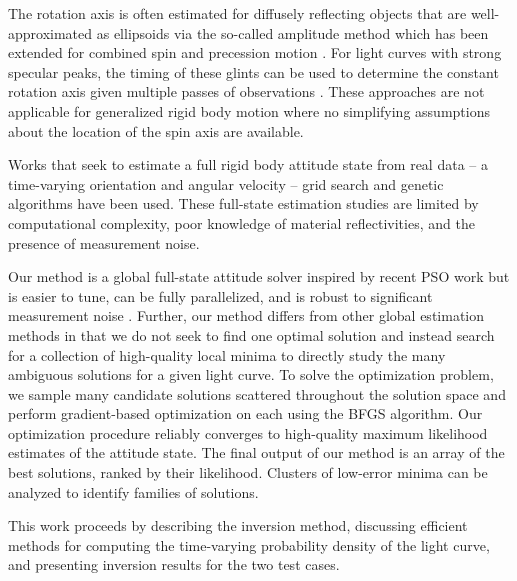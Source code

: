 \documentclass[a4paper,twocolumn]{spaceDebrisC} %
\begin{document}
The rotation axis is often estimated for diffusely reflecting objects that are well-approximated as ellipsoids via the so-called amplitude method \cite{williams1979location} which has been extended for combined spin and precession motion \cite{yanagisawa2012}. For light curves with strong specular peaks, the timing of these glints can be used to determine the constant rotation axis given multiple passes of observations \cite{vananti2023, koshkin2018}. These approaches are not applicable for generalized rigid body motion where no simplifying assumptions about the location of the spin axis are available.

Works that seek to estimate a full rigid body attitude state from real data -- a time-varying orientation and angular velocity -- grid search \cite{shafer2017} and genetic algorithms \cite{piergentili2020, gallucci2020} have been used. These full-state estimation studies are limited by computational complexity, poor knowledge of material reflectivities, and the presence of measurement noise. 

Our method is a global full-state attitude solver inspired by recent PSO work \cite{burton2024journal} but is easier to tune, can be fully parallelized, and is robust to significant measurement noise \cite{robinson2025att}. Further, our method differs from other global estimation methods in that we do not seek to find one optimal solution and instead search for a collection of high-quality local minima to directly study the many ambiguous solutions for a given light curve. To solve the optimization problem, we sample many candidate solutions scattered throughout the solution space and perform gradient-based optimization on each using the BFGS algorithm. Our optimization procedure reliably converges to high-quality maximum likelihood estimates of the attitude state. The final output of our method is an array of the best solutions, ranked by their likelihood. Clusters of low-error minima can be analyzed to identify families of solutions.

This work proceeds by describing the inversion method, discussing efficient methods for computing the time-varying probability density of the light curve, and presenting inversion results for the two test cases.


\end{document}
